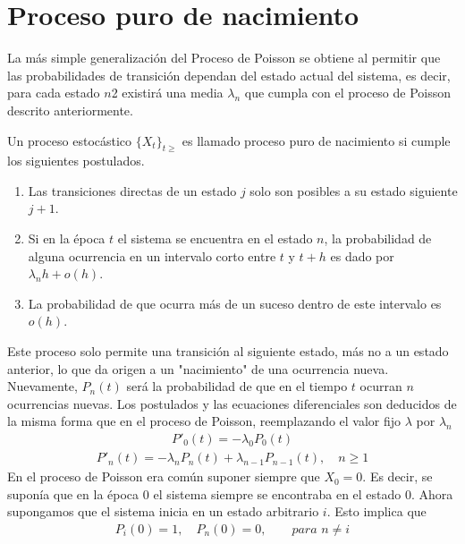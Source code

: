 \section{Proceso puro de nacimiento}
\label{proc_nac}
La más simple generalización del Proceso de Poisson se obtiene al permitir que las probabilidades de transición dependan del estado actual del sistema, es decir, para cada estado $n$2 existirá una media $\lambda_n$ que cumpla con el proceso de Poisson descrito anteriormente.
\begin{Def}
Un proceso estocástico $\{X_t\}_{t\geq}$ es llamado proceso puro de nacimiento si cumple los siguientes postulados.
    \begin{enumerate}
        \item Las transiciones directas de un estado $j$ solo son posibles a su estado siguiente $j+1$.
        \item Si en la época $t$ el sistema se encuentra en el estado $n$, la probabilidad de alguna ocurrencia en un intervalo corto entre $t$ y $t+h$ es dado por $\lambda_n h+o(h)$. 
        \item La probabilidad de que ocurra más de un suceso dentro de este intervalo es $o(h)$.
    \end{enumerate}
\end{Def}
Este proceso solo permite una transición al siguiente estado, más no a un estado anterior, lo que da origen a un "nacimiento" de una ocurrencia nueva.\\Nuevamente, $P_n(t)$ será la probabilidad de que en el tiempo $t$ ocurran $n$ ocurrencias nuevas.
Los postulados y las ecuaciones diferenciales son deducidos de la misma forma que en el proceso de Poisson, reemplazando el valor fijo $\lambda$ por $\lambda_n$
\begin{eqnarray}
    P'_0(t)=-\lambda_0 P_0(t)
    \label{procNacimiento-edo-0}
\end{eqnarray}
\begin{eqnarray}
    P'_n(t)=-\lambda_n P_n(t)+\lambda_{n-1} P_{n-1}(t),\quad n\geq 1
    \label{procNacimiento-edo-n}
\end{eqnarray}
En el proceso de Poisson era común suponer siempre que $X_0=0$. Es decir, se suponía que en la época $0$ el sistema siempre se encontraba en el estado $0$.
Ahora supongamos que el sistema inicia en un estado arbitrario $i$. Esto implica que
\begin{eqnarray}
    P_i(0)=1,\quad P_n(0)=0,\quad\quad\textit{para }n\not=i
    \label{procNacimiento-edo-condInicial}
\end{eqnarray}
